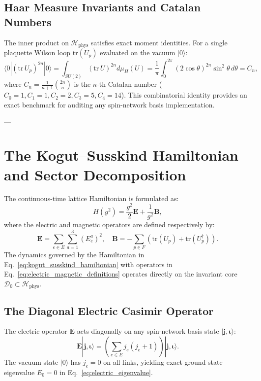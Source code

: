 \documentclass[11pt,reqno]{article}
\begin{document}
\subsection{Haar Measure Invariants and Catalan Numbers}
The inner product on $\mathcal{H}_{\mathrm{phys}}$ satisfies exact moment identities. For a single plaquette Wilson loop $\mathrm{tr}(U_p)$ evaluated on the vacuum $|0\rangle$:
\begin{equation}
    \label{eq:catalan_haar_integral}
    \langle 0 | (\mathrm{tr}\,U_p)^{2n} | 0 \rangle = \int_{SU(2)} (\mathrm{tr}\,U)^{2n} d\mu_H(U) = \frac{1}{\pi}\int_0^{2\pi} (2\cos\theta)^{2n} \sin^2\theta \, d\theta = C_n,
\end{equation}
where $C_n = \frac{1}{n+1}\binom{2n}{n}$ is the $n$-th Catalan number ($C_0=1, C_1=1, C_2=2, C_3=5, C_4=14$). This combinatorial identity provides an exact benchmark for auditing any spin-network basis implementation.

---

\section{The Kogut--Susskind Hamiltonian and Sector Decomposition}
\label{sec:hamiltonian}

The continuous-time lattice Hamiltonian is formulated as:
\begin{equation}
    \label{eq:kogut_susskind_hamiltonian}
    H(g^2) = \frac{g^2}{2} \mathbf{E} + \frac{1}{g^2} \mathbf{B},
\end{equation}
where the electric and magnetic operators are defined respectively by:
\begin{equation}
    \label{eq:electric_magnetic_definitions}
    \mathbf{E} = \sum_{e \in E} \sum_{a=1}^3 (E_e^a)^2, \quad \mathbf{B} = -\sum_{p \in F} \left( \mathrm{tr}(U_p) + \mathrm{tr}(U_p^\dagger) \right).
\end{equation}
The dynamics governed by the Hamiltonian in Eq.~\eqref{eq:kogut_susskind_hamiltonian} with operators in Eq.~\eqref{eq:electric_magnetic_definitions} operates directly on the invariant core $\mathcal{D}_0 \subset \mathcal{H}_{\mathrm{phys}}$.

\subsection{The Diagonal Electric Casimir Operator}
The electric operator $\mathbf{E}$ acts diagonally on any spin-network basis state $|\mathbf{j}, \bm{\iota}\rangle$:
\begin{equation}
    \label{eq:electric_eigenvalue}
    \mathbf{E} |\mathbf{j}, \bm{\iota}\rangle = \left( \sum_{e \in E} j_e(j_e + 1) \right) |\mathbf{j}, \bm{\iota}\rangle.
\end{equation}
The vacuum state $|0\rangle$ has $j_e = 0$ on all links, yielding exact ground state eigenvalue $E_0 = 0$ in Eq.~\eqref{eq:electric_eigenvalue}.
\end{document}

